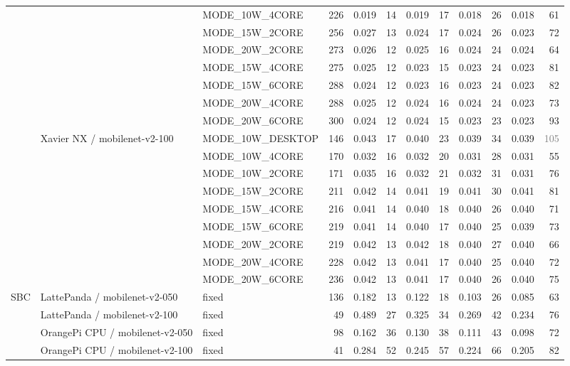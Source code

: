 \documentclass[10pt]{article}
\begin{document}
\begin{center}
\begin{longtable}{@{}lll r *{4}{r r}@{}}
 &  & MODE\_10W\_4CORE & 226 & 0.019 & 14 & 0.019 & 17 & 0.018 & 26 & 0.018 & 61 \\
 &  & MODE\_15W\_2CORE & 256 & 0.027 & 13 & 0.024 & 17 & 0.024 & 26 & 0.023 & 72 \\
 &  & MODE\_20W\_2CORE & 273 & 0.026 & 12 & 0.025 & 16 & 0.024 & 24 & 0.024 & 64 \\
 &  & MODE\_15W\_4CORE & 275 & 0.025 & 12 & 0.023 & 15 & 0.023 & 24 & 0.023 & 81 \\
 &  & MODE\_15W\_6CORE & 288 & 0.024 & 12 & 0.023 & 16 & 0.023 & 24 & 0.023 & 82 \\
 &  & MODE\_20W\_4CORE & 288 & 0.025 & 12 & 0.024 & 16 & 0.024 & 24 & 0.023 & 73 \\
 &  & MODE\_20W\_6CORE & 300 & 0.024 & 12 & 0.024 & 15 & 0.023 & 23 & 0.023 & 93 \\
\addlinespace[2pt]
 & Xavier NX / mobilenet-v2-100 & MODE\_10W\_DESKTOP & 146 & 0.043 & 17 & 0.040 & 23 & 0.039 & 34 & 0.039 & \textcolor{gray}{105} \\
 &  & MODE\_10W\_4CORE & 170 & 0.032 & 16 & 0.032 & 20 & 0.031 & 28 & 0.031 & 55 \\
 &  & MODE\_10W\_2CORE & 171 & 0.035 & 16 & 0.032 & 21 & 0.032 & 31 & 0.031 & 76 \\
 &  & MODE\_15W\_2CORE & 211 & 0.042 & 14 & 0.041 & 19 & 0.041 & 30 & 0.041 & 81 \\
 &  & MODE\_15W\_4CORE & 216 & 0.041 & 14 & 0.040 & 18 & 0.040 & 26 & 0.040 & 71 \\
 &  & MODE\_15W\_6CORE & 219 & 0.041 & 14 & 0.040 & 17 & 0.040 & 25 & 0.039 & 73 \\
 &  & MODE\_20W\_2CORE & 219 & 0.042 & 13 & 0.042 & 18 & 0.040 & 27 & 0.040 & 66 \\
 &  & MODE\_20W\_4CORE & 228 & 0.042 & 13 & 0.041 & 17 & 0.040 & 25 & 0.040 & 72 \\
 &  & MODE\_20W\_6CORE & 236 & 0.042 & 13 & 0.041 & 17 & 0.040 & 26 & 0.040 & 75 \\
\addlinespace[2pt]
SBC & LattePanda / mobilenet-v2-050 & fixed & 136 & 0.182 & 13 & 0.122 & 18 & 0.103 & 26 & 0.085 & 63 \\
\addlinespace[2pt]
 & LattePanda / mobilenet-v2-100 & fixed & 49 & 0.489 & 27 & 0.325 & 34 & 0.269 & 42 & 0.234 & 76 \\
\addlinespace[2pt]
 & OrangePi CPU / mobilenet-v2-050 & fixed & 98 & 0.162 & 36 & 0.130 & 38 & 0.111 & 43 & 0.098 & 72 \\
\addlinespace[2pt]
 & OrangePi CPU / mobilenet-v2-100 & fixed & 41 & 0.284 & 52 & 0.245 & 57 & 0.224 & 66 & 0.205 & 82 \\

\end{longtable}
\end{center}
\end{document}
